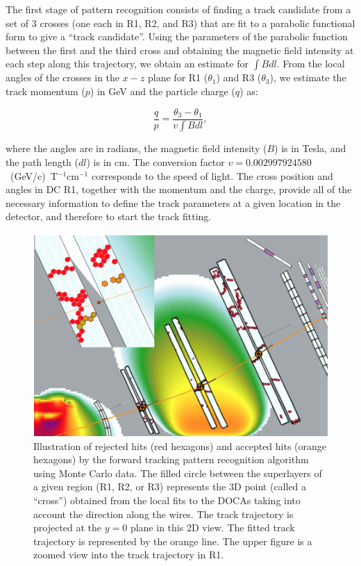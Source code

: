The first stage of pattern recognition consists of finding a track candidate from a set of 3 crosses (one each in R1,
R2, and R3) that are fit to a parabolic functional form to give a ``track candidate''. Using the parameters of the
parabolic function between the first and the third cross and obtaining the magnetic field intensity at each step along
this trajectory, we obtain an estimate for $\int \!\!B dl$. From the local angles of the crosses in the $x-z$ plane for
R1 ($\theta_1$) and R3 ($\theta_3$), we estimate the track momentum ($p$) in GeV and the particle charge ($q$) as:

\begin{equation}
  \frac{q}{p} = \frac{\theta_3 - \theta_1}{v \int \!\!B dl},
\end{equation}

\noindent
where the angles are in radians, the magnetic field intensity ($B$) is in Tesla, and the path length ($dl$) is in cm.
The conversion factor $v = 0.002997924580$~(GeV/c)~T$^{-1}$cm$^{-1}$ corresponds to the speed of light. The
cross position and angles in DC R1, together with the momentum and the charge, provide all of the necessary
information to define the track parameters at a given location in the detector, and therefore to start the track
fitting.

\begin{figure}[t]
\centering
\includegraphics[width=0.9\columnwidth]{pics/dcPattern13.png}
\caption{Illustration of rejected hits (red hexagons) and accepted hits (orange hexagons) by the forward tracking
  pattern recognition algorithm using Monte Carlo data. The filled circle between the superlayers of a given region (R1,
  R2, or R3) represents the 3D point (called a ``cross'') obtained from the local fits to the DOCAs taking into account
  the direction along the wires. The track trajectory is projected at the $y=0$ plane in this 2D view. The fitted track
  trajectory is represented by the orange line. The upper figure is a zoomed view into the track trajectory in R1.}
\label{fig:dcsegs}
\end{figure}

